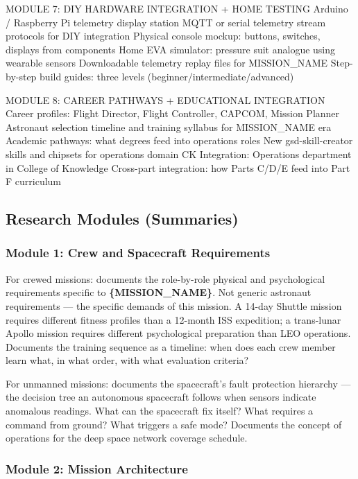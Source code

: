 \documentclass[11pt,letterpaper]{article}
\newcommand{\param}[1]{\textcolor{paramred}{\textbf{\{#1\}}}}
\begin{document}
\begin{asciibox}
MODULE 7: DIY HARDWARE INTEGRATION + HOME TESTING
  Arduino / Raspberry Pi telemetry display station
  MQTT or serial telemetry stream protocols for DIY integration
  Physical console mockup: buttons, switches, displays from components
  Home EVA simulator: pressure suit analogue using wearable sensors
  Downloadable telemetry replay files for {MISSION\_NAME}
  Step-by-step build guides: three levels (beginner/intermediate/advanced)

MODULE 8: CAREER PATHWAYS + EDUCATIONAL INTEGRATION
  Career profiles: Flight Director, Flight Controller, CAPCOM, Mission Planner
  Astronaut selection timeline and training syllabus for {MISSION\_NAME} era
  Academic pathways: what degrees feed into operations roles
  New gsd-skill-creator skills and chipsets for operations domain
  CK Integration: Operations department in College of Knowledge
  Cross-part integration: how Parts C/D/E feed into Part F curriculum
\end{asciibox}

\subsection{Research Modules (Summaries)}

\subsubsection{Module 1: Crew and Spacecraft Requirements}

For crewed missions: documents the role-by-role physical and psychological requirements specific to \param{MISSION\_NAME}. Not generic astronaut requirements --- the specific demands of this mission. A 14-day Shuttle mission requires different fitness profiles than a 12-month ISS expedition; a trans-lunar Apollo mission requires different psychological preparation than LEO operations. Documents the training sequence as a timeline: when does each crew member learn what, in what order, with what evaluation criteria?

For unmanned missions: documents the spacecraft's fault protection hierarchy --- the decision tree an autonomous spacecraft follows when sensors indicate anomalous readings. What can the spacecraft fix itself? What requires a command from ground? What triggers a safe mode? Documents the concept of operations for the deep space network coverage schedule.

\subsubsection{Module 2: Mission Architecture}
\end{document}
